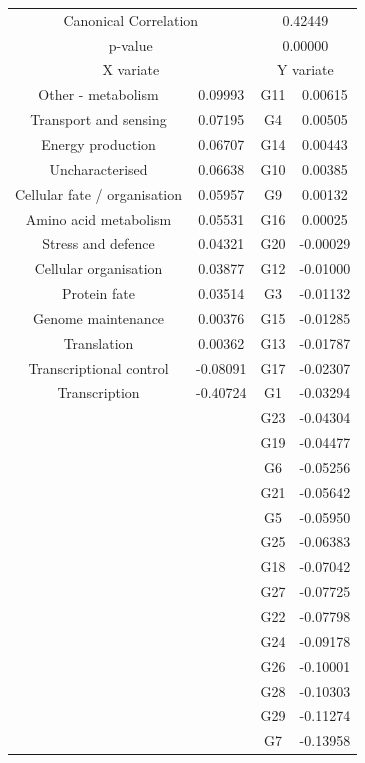 

\begin{figure}[H]
\centering
\begin{tabular}{ c c | c c }
  \multicolumn{2}{c}{Canonical Correlation} &  \multicolumn{2}{c}{0.42449} \\
  \multicolumn{2}{c}{p-value} &  \multicolumn{2}{c}{0.00000} \\
  \hline
  \multicolumn{2}{c}{X variate} & \multicolumn{2}{c}{Y variate}\\
  \hline
 Other - metabolism & 0.09993 &  G11 & 0.00615\\
 Transport and sensing & 0.07195 &  G4 & 0.00505\\
 Energy production & 0.06707 &  G14 & 0.00443\\
 Uncharacterised & 0.06638 &  G10 & 0.00385\\
 Cellular fate / organisation & 0.05957 &  G9 & 0.00132\\
 Amino acid metabolism & 0.05531 &  G16 & 0.00025\\
 Stress and defence & 0.04321 &  G20 & -0.00029\\
 Cellular organisation & 0.03877 &  G12 & -0.01000\\
 Protein fate & 0.03514 &  G3 & -0.01132\\
 Genome maintenance & 0.00376 &  G15 & -0.01285\\
 Translation & 0.00362 &  G13 & -0.01787\\
 Transcriptional control & -0.08091 &  G17 & -0.02307\\
 Transcription & -0.40724 &  G1 & -0.03294\\
 & &  G23 & -0.04304\\
 & &  G19 & -0.04477\\
 & &  G6 & -0.05256\\
 & &  G21 & -0.05642\\
 & &  G5 & -0.05950\\
 & &  G25 & -0.06383\\
 & &  G18 & -0.07042\\
 & &  G27 & -0.07725\\
 & &  G22 & -0.07798\\
 & &  G24 & -0.09178\\
 & &  G26 & -0.10001\\
 & &  G28 & -0.10303\\
 & &  G29 & -0.11274\\
 & &  G7 & -0.13958\\

\end{tabular}
\end{figure}
